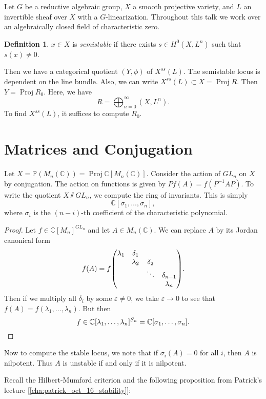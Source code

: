 \documentclass[leqno, openany]{memoir}
\theoremstyle{definition}
\newtheorem{defn}[thm]{Definition}
\theoremstyle{remark}
\theoremstyle{plain}
\theoremstyle{definition}
\theoremstyle{remark}
\newcommand{\C}{\mathbb{C}}
\renewcommand{\P}{\mathbb{P}}
\newcommand{\ep}{\varepsilon}
\DeclareMathOperator{\Proj}{Proj}
\begin{document}
Let $G$ be a reductive algebraic group, $X$ a smooth projective variety, and $L$ an invertible sheaf over $X$ with a $G$-linearization. Throughout this talk we work over an algebraically closed field of characteristic zero.

\begin{defn}
    $x \in X$ is \textit{semistable} if there exists $s \in H^0(X, L^n)$ such that $s(x) \neq 0$. 
\end{defn}

Then we have a categorical quotient $(Y, \phi)$ of $X^{ss}(L)$. The semistable locus is dependent on the line bundle. Also, we can write $X^{ss}(L) \subset X = \operatorname{Proj} R$. Then $Y = \operatorname{Proj} R_0$. Here, we have
\[ R = \bigoplus_{n=0}^{\infty}(X, L^n). \]
To find $X^{ss}(L)$, it suffices to compute $R_0$.

\section{Matrices and Conjugation}%
\label{sec:matrices_and_conjugation}

Let $X = \P(M_{n}(\C)) = \Proj \C[M_{n}(\C)]$. Consider the action of $GL_n$ on $X$ by conjugation. The action on functions is given by $Pf(A) = f(P^{-1}AP)$. To write the quotient $X \sslash GL_n$, we compute the ring of invariants. This is simply
\[ \C[\sigma_1, \ldots, \sigma_n], \]
where $\sigma_i$ is the $(n-i)$-th coefficient of the characteristic polynomial. 

\begin{proof}
    Let $f \in \C[M_n]^{GL_n}$ and let $A \in M_n(\C)$. We can replace $A$ by its Jordan canonical form
    \[ f(A) = f \mqty(\lambda_1 & \delta_1 & & \\
        & \lambda_2 & \delta_2 & \\
        & & \ddots & \delta_{n-1} \\
        & & & \lambda_n). \]
        Then if we multiply all $\delta_i$ by some $\ep \neq 0$, we take $\ep \to 0$ to see that $f(A) = f(\lambda_1, \ldots, \lambda_n)$. But then
        \[ f \in \C[\lambda_1, \ldots, \lambda_n]^{S_n} = \C[\sigma_1, \ldots, \sigma_n]. \qedhere \]
\end{proof}

Now to compute the stable locus, we note that if $\sigma_i(A) = 0$ for all $i$, then $A$ is nilpotent. Thus $A$ is unstable if and only if it is nilpotent.

Recall the Hilbert-Mumford criterion and the following proposition from Patrick's lecture [\autoref{cha:patrick_oct_16_stability}]:
\end{document}
